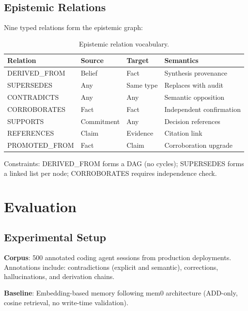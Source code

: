 \documentclass[11pt,a4paper]{article}
\begin{document}
\subsection{Epistemic Relations}

Nine typed relations form the epistemic graph:

\begin{table}[H]
\centering
\caption{Epistemic relation vocabulary.}
\label{tab:relations}
\begin{tabular}{@{}llll@{}}
\toprule
\textbf{Relation} & \textbf{Source} & \textbf{Target} & \textbf{Semantics} \\
\midrule
DERIVED\_FROM & Belief & Fact & Synthesis provenance \\
SUPERSEDES & Any & Same type & Replaces with audit \\
CONTRADICTS & Any & Any & Semantic opposition \\
CORROBORATES & Fact & Fact & Independent confirmation \\
SUPPORTS & Commitment & Any & Decision references \\
REFERENCES & Claim & Evidence & Citation link \\
PROMOTED\_FROM & Fact & Claim & Corroboration upgrade \\
\bottomrule
\end{tabular}
\end{table}

Constraints: DERIVED\_FROM forms a DAG (no cycles); SUPERSEDES forms a linked list per node; CORROBORATES requires independence check.

\section{Evaluation}
\label{sec:eval}

\subsection{Experimental Setup}

\textbf{Corpus}: 500 annotated coding agent sessions from production deployments. Annotations include: contradictions (explicit and semantic), corrections, hallucinations, and derivation chains.

\textbf{Baseline}: Embedding-based memory following mem0 architecture (ADD-only, cosine retrieval, no write-time validation).
\end{document}
